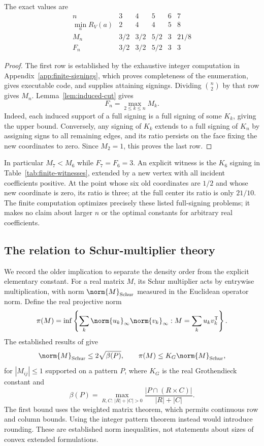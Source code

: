 \begin{proposition}\label{prop:finite-signings}
The exact values are
\[
\begin{array}{c|rrrrr}
 n&3&4&5&6&7\\\hline
 \min_a R_V(a)&2&4&4&5&8\\
 M_n&3/2&3/2&5/2&3&21/8\\
 F_n&3/2&3/2&5/2&3&3
\end{array}
\]
\end{proposition}
\begin{proof}
The first row is established by the exhaustive integer computation in
Appendix~\ref{app:finite-signings}, which proves completeness of the
enumeration, gives executable code, and supplies attaining signings.
Dividing $\binom n2$ by that row gives $M_n$.
Lemma~\ref{lem:induced-cut} gives
\[
 F_n=\max_{2\le k\le n} M_k.
\]
Indeed, each induced support of a full signing is a full signing of some
$K_k$, giving the upper bound. Conversely, any signing of $K_k$ extends
to a full signing of $K_n$ by assigning signs to all remaining edges,
and its ratio persists on the face fixing the new coordinates to zero.
Since $M_2=1$, this proves the last row.
\end{proof}

In particular $M_7<M_6$ while $F_7=F_6=3$. An explicit witness is the
$K_6$ signing in Table~\ref{tab:finite-witnesses}, extended by a new vertex
with all incident coefficients positive. At the point whose six old
coordinates are $1/2$ and whose new coordinate is zero, its ratio is three;
at the full center its ratio is only $21/10$. The finite computation
optimizes precisely these listed full-signing problems; it makes no claim
about larger $n$ or the optimal constants for arbitrary real coefficients.

\subsection{The relation to Schur-multiplier theory}\label{subsec:schur}
We record the older implication to separate the density order from the
explicit elementary constant. For a real matrix $M$, its Schur multiplier
acts by entrywise multiplication, with norm $\norm{M}_{\mathrm{Schur}}$
measured in the Euclidean operator norm. Define the real projective norm
\[
 \pi(M)=\inf\left\{\sum_k\norm{u_k}_\infty\norm{v_k}_\infty:
                         M=\sum_k u_kv_k^{\mathsf T}\right\}.
\]
The established results of
\citet[Theorems 1.2 and 2.4]{DavidsonDonsig2007} give
\begin{equation}\label{eq:schur-input}
 \norm{M}_{\mathrm{Schur}}\le2\sqrt{\beta(P)},\qquad
 \pi(M)\le K_G\norm{M}_{\mathrm{Schur}},
\end{equation}
for $|M_{ij}|\le1$ supported on a pattern $P$, where $K_G$ is the real
Grothendieck constant and
\[
 \beta(P)=\max_{R,C:\,|R|+|C|>0}
             \frac{|P\cap(R\times C)|}{|R|+|C|}.
\]
The first bound uses the weighted matrix theorem, which permits continuous
row and column bounds. Using the integer pattern theorem instead would
introduce rounding. These are established norm inequalities, not statements
about sizes of convex extended formulations.

